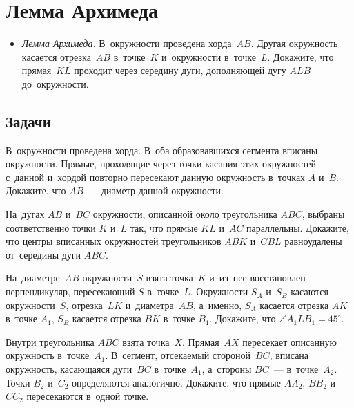 

\section*{Лемма Архимеда}


\begin{itemize}

\item\emph{Лемма Архимеда.}
В~окружности проведена хорда~$AB$.
Другая окружность касается отрезка~$AB$ в~точке~$K$ и~окружности в~точке~$L$.
Докажите, что прямая~$KL$ проходит через середину дуги, дополняющей дугу $ALB$
до~окружности.

\end{itemize}

\subsection*{Задачи}

\begin{problems}

\item
В~окружности проведена хорда.
В~оба образовавшихся сегмента вписаны окружности.
Прямые, проходящие через точки касания этих окружностей с~данной и~хордой
повторно пересекают данную окружность в~точках $A$ и~$B$.
Докажите, что $AB$~--- диаметр данной окружности.

\item
На~дугах $AB$ и~$BC$ окружности, описанной около треугольника $ABC$, выбраны
соответственно точки $K$ и~$L$ так, что прямые $KL$ и~$AC$ параллельны.
Докажите, что центры вписанных окружностей треугольников $ABK$ и~$CBL$
равноудалены от~середины дуги $ABC$.

\item
На~диаметре~$AB$ окружности~$S$ взята точка~$K$ и~из~нее восстановлен
перпендикуляр, пересекающий $S$ в~точке~$L$.
Окружности $S_A$ и~$S_B$ касаются окружности~$S$, отрезка~$LK$ и~диаметра~$AB$,
а~именно, $S_A$ касается отрезка $AK$ в~точке $A_1$, $S_B$ касается отрезка
$BK$ в~точке $B_1$.
Докажите, что $\angle A_1 L B_1 = 45^{\circ}$.

\item
Внутри треугольника $ABC$ взята точка~$X$.
Прямая~$AX$ пересекает описанную окружность в~точке~$A_1$.
В~сегмент, отсекаемый стороной~$BC$, вписана окружность, касающаяся дуги~$BC$
в~точке~$A_1$, а~стороны $BC$~--- в~точке~$A_2$.
Точки $B_2$ и~$C_2$ определяются аналогично.
Докажите, что прямые $A A_2$, $B B_2$ и~$C C_2$ пересекаются в~одной точке.

\end{problems}


